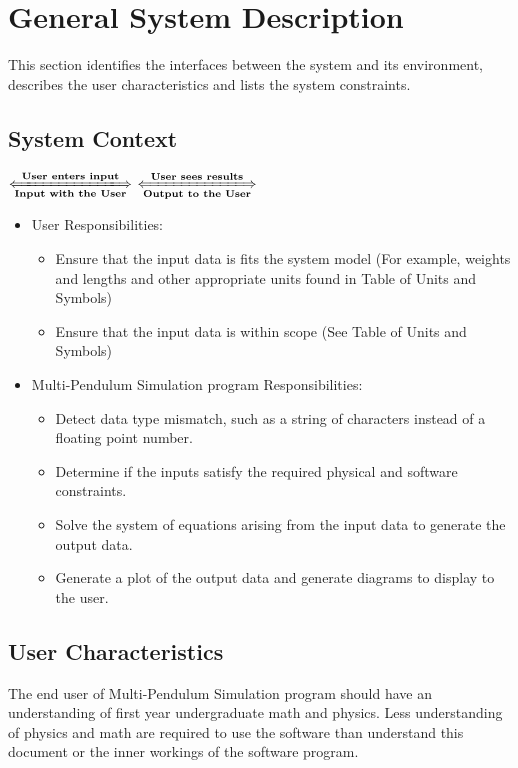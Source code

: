 \documentclass[12pt]{article}
\newcommand{\progname}{Multi-Pendulum Simulation }
\begin{document}
\section{General System Description}
This section identifies the interfaces between the system and its environment,
describes the user characteristics and lists the system constraints.

\subsection{System Context}

\begin{center}
 $ \xLongleftrightarrow[\textbf{Input with the
User}]{\textbf{User enters input}} $\framebox{\textbf { \progname}}
$ \xLongleftrightarrow[\textbf{Output to the User}] {\textbf{User sees results}}$\\
\end{center}

\begin{itemize}
\item User Responsibilities:
\begin{itemize}
\item Ensure that the input data is fits the system model (For example, weights and lengths and other
appropriate units found in Table of Units and Symbols)
\item Ensure that the input data is within scope (See Table of Units and Symbols)
\end{itemize}
\item \progname program Responsibilities:
\begin{itemize}
\item Detect data type mismatch, such as a string of characters instead of a
  floating point number.
\item Determine if the inputs satisfy the required physical and software 
  constraints.
\item Solve the system of equations arising from the input data to generate 
  the output data.
\item Generate a plot of the output data and generate diagrams to display to the user.
\end{itemize}
\end{itemize}

\subsection{User Characteristics}
The end user of \progname program should have an understanding of first year 
undergraduate math and physics. Less understanding of physics and math are
required to use the software than understand
this document or the inner workings of the software program.
\end{document}
